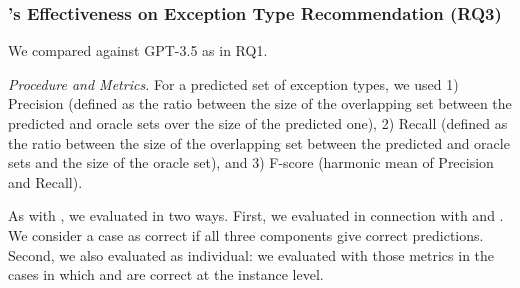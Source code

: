 \vspace{-6pt}
\subsubsection{{\xtype}'s Effectiveness on Exception Type Recommendation (RQ3)}

 We compared {\xtype} against GPT-3.5 as in RQ1.






{\em Procedure and Metrics.} For a predicted set of exception types,
we used 1) Precision (defined as the ratio between the size of the
overlapping set between the predicted and oracle sets over the size of
the predicted one), 2) Recall (defined as the ratio between the size
of the overlapping set between the predicted and oracle sets and the
size of the oracle set), and 3) F-score (harmonic mean of Precision
and Recall).

As with {\xstate}, we evaluated {\xtype} in two ways. First, we
evaluated {\xtype} in connection with {\xblock} and {\xstate}. We
consider a case as correct if all three components give correct
predictions.
Second, we also evaluated {\xtype} as individual: we evaluated
{\xtype} with those metrics in the cases in which {\xblock} and
{\xstate} are correct at the instance level.


